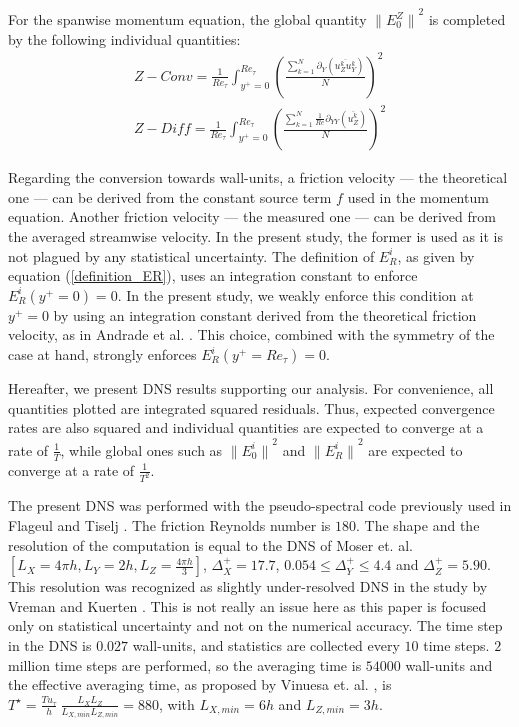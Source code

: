 \documentclass[aip,pof,reprint]{revtex4-1}
\begin{document}
For the spanwise momentum equation, the global quantity ${\parallel{E_0^Z}\parallel}^2$ is completed by the following individual quantities:
\begin{eqnarray}
Z-Conv = \frac{1}{{Re}_\tau} \int_{y^+=0}^{{Re}_\tau} \left( \frac{\sum_{k=1}^N \partial_Y \left( \overline{u_Z^k u_Y^k} \right) }{N} \right)^2 \\
Z-Diff = \frac{1}{{Re}_\tau} \int_{y^+=0}^{{Re}_\tau} \left( \frac{\sum_{k=1}^N \frac{1}{Re}\partial_{YY}\left( \overline{u_Z^k} \right) }{N} \right)^2
\end{eqnarray}

Regarding the conversion towards wall-units, a friction velocity  --- the theoretical one --- can be derived from the constant source term $f$ used in the momentum equation.
Another friction velocity --- the measured one --- can be derived from the averaged streamwise velocity.
In the present study, the former is used as it is not plagued by any statistical uncertainty.
The definition of $E^i_R$, as given by equation (\ref{definition_ER}), uses an integration constant to enforce $E^i_R \left( y^+ = 0 \right) = 0$.
In the present study, we weakly enforce this condition at $y^+=0$ by using an integration constant derived from the theoretical friction velocity, as in Andrade et al. \cite{andrade}.
This choice, combined with the symmetry of the case at hand, strongly enforces $E^i_R \left( y^+ = Re_\tau \right) = 0$.

Hereafter, we present DNS results supporting our analysis.
For convenience, all quantities plotted are integrated squared residuals.
Thus, expected convergence rates are also squared and individual quantities are expected to converge at a rate of $\frac{1}{T}$, while global ones such as ${\parallel{E_0^i}\parallel}^2$ and ${\parallel{E^i_R}\parallel}^2$ are expected to converge at a rate of $\frac{1}{T^2}$.

The present DNS was performed with the pseudo-spectral code previously used in Flageul and Tiselj \cite{flageul}.
The friction Reynolds number is $180$.
The shape and the resolution of the computation is equal to the DNS of Moser et. al. \cite{moser} $\left[ L_X = 4 \pi h, L_Y = 2h, L_Z = \frac{4 \pi h}{3}\right]$, $\Delta_X^+ = 17.7$, $0.054 \leq \Delta_Y^+ \leq 4.4$ and $\Delta_Z^+ = 5.90$.
This resolution was recognized as slightly under-resolved DNS in the study by Vreman and Kuerten \cite{vreman}.
This is not really an issue here as this paper is focused only on statistical uncertainty and not on the numerical accuracy.
The time step in the DNS is $0.027$ wall-units, and statistics are collected every $10$ time steps.
$2$ million time steps are performed, so the averaging time is $54000$ wall-units and the effective averaging time, as proposed by Vinuesa et. al. \cite{vinuesa}, is 
$T^\star = \frac{T u_\tau}{h} ~ \frac{L_X L_Z}{L_{X,min} L_{Z,min}} = 880$, with $L_{X,min} = 6h$ and $L_{Z,min} = 3h$.
\end{document}
